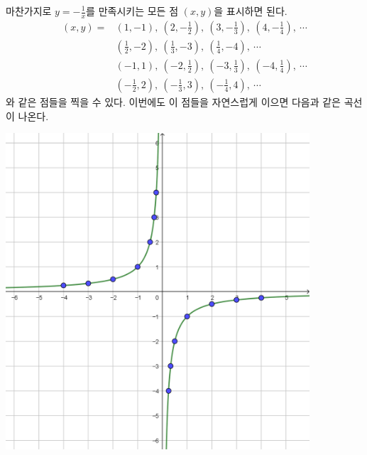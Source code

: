 \documentclass{oblivoir}
\begin{document}
%
\begin{mdframed}\label{rational4}
마찬가지로
\(y=-\frac1x\)를 만족시키는 모든 점 \((x,y)\)을 표시하면 된다.\\
\begin{align*}
(x,y)
=&\textstyle(1,-1),\:(2,-\frac12),\:(3,-\frac13),\:(4,-\frac14),\:\cdots\\
&\textstyle(\frac12,-2),\:(\frac13,-3),\:(\frac14,-4),\:\cdots\\
&\textstyle(-1,1),\:(-2,\frac12),\:(-3,\frac13),\:(-4,\frac14),\:\cdots\\
&\textstyle(-\frac12,2),\:(-\frac13,3),\:(-\frac14,4),\:\cdots
\end{align*}
와 같은 점들을 찍을 수 있다.
이번에도 이 점들을 자연스럽게 이으면 다음과 같은 곡선이 나온다.
\begin{center}
\includegraphics[width=0.85\textwidth]{rational_4}
\end{center}
\end{mdframed}
\end{document}
